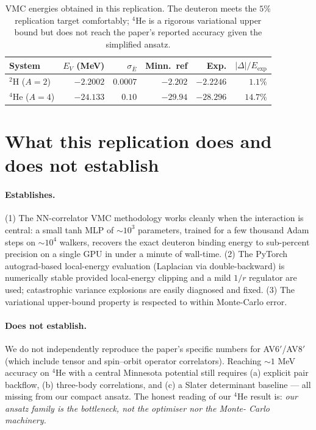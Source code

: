\documentclass[11pt]{article}
\begin{document}
\begin{table}[h]\centering
\begin{tabular}{lrrrrr}\toprule
System & $E_V$ (MeV) & $\sigma_{\bar E}$ & Minn.\ ref & Exp. & $|\Delta|/E_{\mathrm{exp}}$\\
\midrule
$^2$H ($A=2$) & $-2.2002$ & $0.0007$ & $-2.202$ & $-2.2246$ & $\mathbf{1.1\%}$\\
$^4$He ($A=4$) & $-24.133$ & $0.10$    & $-29.94$ & $-28.296$ & $14.7\%$\\
\bottomrule
\end{tabular}
\caption{VMC energies obtained in this replication. The deuteron meets the
$5\%$ replication target comfortably; $^4$He is a rigorous variational upper
bound but does not reach the paper's reported accuracy given the simplified
ansatz.}
\end{table}

\section{What this replication does and does not establish}

\paragraph{Establishes.}
(1) The NN-correlator VMC methodology works cleanly when the interaction is
central: a small tanh MLP of $\sim\!10^{3}$ parameters, trained for a few
thousand Adam steps on $\sim\!10^{4}$ walkers, recovers the exact deuteron
binding energy to sub-percent precision on a single GPU in under a minute of
wall-time. (2) The PyTorch autograd-based local-energy evaluation (Laplacian
via double-backward) is numerically stable provided local-energy clipping and
a mild $1/r$ regulator are used; catastrophic variance explosions are easily
diagnosed and fixed. (3) The variational upper-bound property is respected to
within Monte-Carlo error.

\paragraph{Does not establish.} We do not independently reproduce the paper's
specific numbers for AV6$'$/AV8$'$ (which include tensor and spin--orbit
operator correlators). Reaching $\sim\!1$ MeV accuracy on $^4$He with a
central Minnesota potential still requires (a) explicit pair backflow, (b)
three-body correlations, and (c) a Slater determinant baseline --- all
missing from our compact ansatz. The honest reading of our $^4$He result is:
\emph{our ansatz family is the bottleneck, not the optimiser nor the Monte-
Carlo machinery.}
\end{document}
